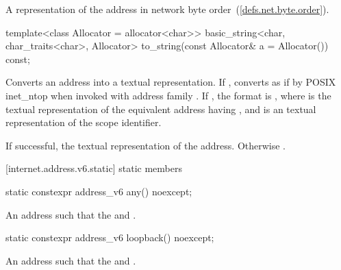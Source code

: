 \begin{itemdescr}
\pnum
\returns A representation of the address in network byte order~(\ref{defs.net.byte.order}).
\end{itemdescr}

%
\begin{itemdecl}
template<class Allocator = allocator<char>>
  basic_string<char, char_traits<char>, Allocator>
    to_string(const Allocator& a = Allocator()) const;
\end{itemdecl}

\begin{itemdescr}
\pnum
\effects Converts an address into a textual representation. If , converts as if by POSIX inet_ntop when invoked with address family . If , the format is \tcode{\%}, where  is the textual representation of the equivalent address having , and  is an  textual representation of the scope identifier.

\pnum
\returns If successful, the textual representation of the address. Otherwise .
\end{itemdescr}



[internet.address.v6.static]{ static members}

%
\begin{itemdecl}
static constexpr address_v6 any() noexcept;
\end{itemdecl}

\begin{itemdescr}
\pnum
\returns An address  such that the  and .
\end{itemdescr}

%
\begin{itemdecl}
static constexpr address_v6 loopback() noexcept;
\end{itemdecl}

\begin{itemdescr}
\pnum
\returns An address  such that the  and .
\end{itemdescr}




